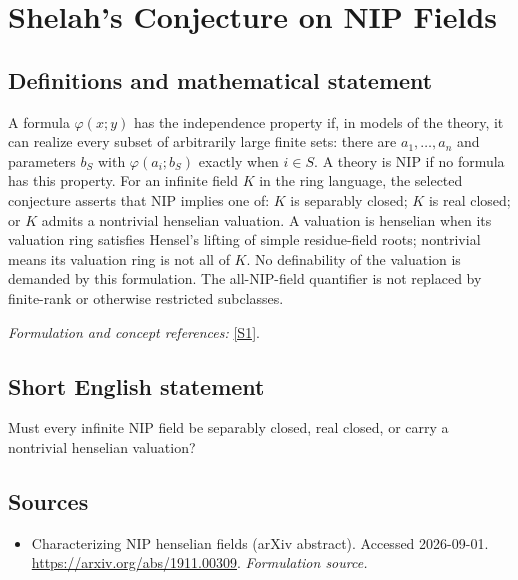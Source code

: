 \documentclass[11pt]{article}
\begin{document}
\section*{\texorpdfstring{Shelah's Conjecture on NIP Fields}{Shelah's Conjecture on NIP Fields}}\label{30006870}
\subsection{Definitions and mathematical statement}
A formula $\varphi(x;y)$ has the independence property if, in models of the theory, it can realize every subset of arbitrarily large finite sets: there are $a_1,\ldots,a_n$ and parameters $b_S$ with $\varphi(a_i;b_S)$ exactly when $i\in S$. A theory is NIP if no formula has this property. For an infinite field $K$ in the ring language, the selected conjecture asserts that NIP implies one of: $K$ is separably closed; $K$ is real closed; or $K$ admits a nontrivial henselian valuation. A valuation is henselian when its valuation ring satisfies Hensel's lifting of simple residue-field roots; nontrivial means its valuation ring is not all of $K$. No definability of the valuation is demanded by this formulation. The all-NIP-field quantifier is not replaced by finite-rank or otherwise restricted subclasses.
\par\smallskip\textit{Formulation and concept references:} \href{https://arxiv.org/abs/1911.00309}{[S1]}.

\subsection{Short English statement}
Must every infinite NIP field be separably closed, real closed, or carry a nontrivial henselian valuation?
\subsection{Sources}
\begin{itemize}
\item[S1]Characterizing NIP henselian fields (arXiv abstract). Accessed 2026-09-01.
\url{https://arxiv.org/abs/1911.00309}.
\textit{Formulation source.}
\end{itemize}
\end{document}
